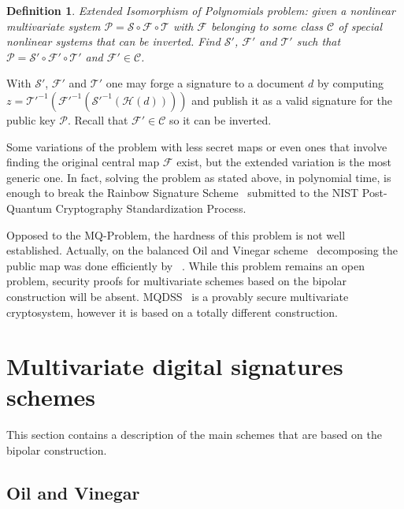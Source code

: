 \documentclass{ufsctex/ufsctex}
\newtheorem{definition}{Definition}
\begin{document}
\begin{definition}
Extended Isomorphism of Polynomials problem: given a nonlinear multivariate
system $\mathcal{P} = \mathcal{S} \circ \mathcal{F} \circ \mathcal{T}$ with
$\mathcal{F}$ belonging to some class $\mathcal{C}$ of special nonlinear
systems that can be inverted. Find $\mathcal{S}'$, $\mathcal{F}'$ and
$\mathcal{T}'$ such that $\mathcal{P} = \mathcal{S}' \circ \mathcal{F}' \circ
\mathcal{T}'$ and $\mathcal{F}' \in \mathcal{C}$.
\end{definition}

With $\mathcal{S}'$, $\mathcal{F}'$ and $\mathcal{T}'$ one may forge a
signature to a document $d$ by computing $z =
\mathcal{T}'^{-1}(\mathcal{F}'^{-1}(\mathcal{S}'^{-1}(\mathcal{H}(d))))$ and
publish it as a valid signature for the public key $\mathcal{P}$. Recall that
$\mathcal{F}' \in \mathcal{C}$ so it can be inverted.

Some variations of the problem with less secret maps or even ones that involve
finding the original central map $\mathcal{F}$ exist, but the extended
variation is the most generic one. In fact, solving the problem as stated
above, in polynomial time, is enough to break the Rainbow Signature
Scheme~\cite{ding2005rainbow} submitted to the NIST Post-Quantum Cryptography
Standardization Process.

Opposed to the MQ-Problem, the hardness of this problem is not well
established. Actually, on the balanced Oil and Vinegar
scheme~\cite{patarin1997ov} decomposing the public map was done efficiently by
~\cite{kipnis1998cryptanalysis}. While this problem remains an open problem,
security proofs for multivariate schemes based on the bipolar construction will
be absent. MQDSS~\cite{chen20165} is a provably secure multivariate cryptosystem,
however it is based on a totally different construction.

\section{Multivariate digital signatures schemes}\label{sec:mqschemes}

This section contains a description of the main schemes that are based on the
bipolar construction.

\subsection{Oil and Vinegar}\label{sec:ov}
\end{document}

